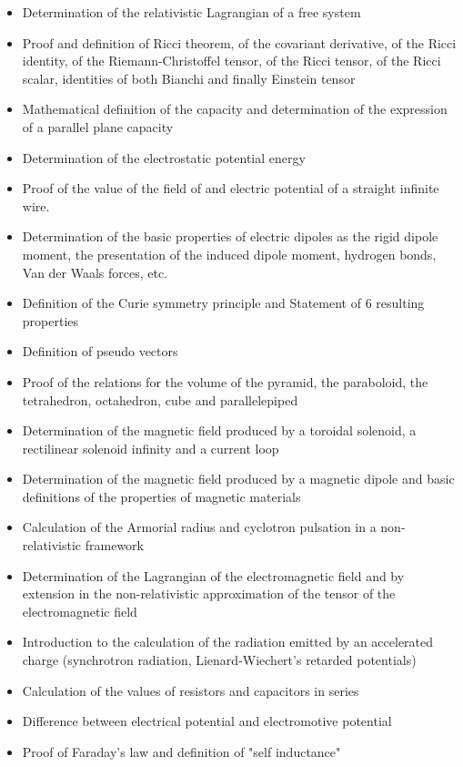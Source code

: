 \begin{itemize}
\begin{itemize}[noitemsep]
			\item Determination of the relativistic Lagrangian of a free system
			\item Proof and definition of Ricci theorem, of the covariant derivative, of the Ricci identity, of the Riemann-Christoffel tensor, of the Ricci tensor, of the Ricci scalar, identities of both Bianchi and finally Einstein tensor
			\item Mathematical definition of the capacity and determination of the expression of a  parallel plane capacity
			\item Determination of the electrostatic potential energy
			\item Proof of the value of the field of and electric potential of a straight infinite wire.
			\item Determination of the basic properties of electric dipoles as the rigid dipole moment, the presentation of the induced dipole moment, hydrogen bonds, Van der Waals forces, etc.
			\item Definition of the Curie symmetry principle and Statement of 6 resulting properties
			\item Definition of pseudo vectors
			\item Proof of the relations for the volume of the pyramid, the paraboloid, the tetrahedron, octahedron, cube and parallelepiped
			\item Determination of the magnetic field produced by a toroidal solenoid, a rectilinear solenoid infinity and a current loop
			\item Determination of the magnetic field produced by a magnetic dipole and basic definitions of the properties of magnetic materials
			\item Calculation of the Armorial radius and cyclotron pulsation in a non-relativistic framework
			\item Determination of the Lagrangian of the electromagnetic field and by extension in the non-relativistic approximation of the tensor of the electromagnetic field
			\item Introduction to the calculation of the radiation emitted by an accelerated charge (synchrotron radiation, Lienard-Wiechert's retarded potentials)
			\item Calculation of the values of resistors and capacitors in series
			\item Difference between electrical potential and electromotive potential
			\item Proof of Faraday's law and definition of "self inductance"

\end{itemize}
\end{itemize}
